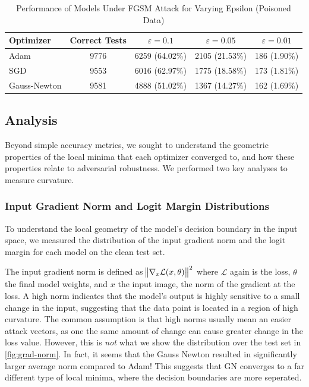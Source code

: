 \documentclass{article}
\begin{document}
    \begin{table}[ht!]
        \centering
        \caption{Performance of Models Under FGSM Attack for Varying Epsilon (Poisoned Data)}
        \label{tab:fgsm_results_poisoned}
        \begin{tabular}{|l|c|c|c|c|}
            \hline
            \textbf{Optimizer} & \textbf{Correct Tests} & $\varepsilon=0.1$ & $\varepsilon=0.05$ & $\varepsilon=0.01$ \\
            \hline
            Adam               & 9776                   & 6259 (64.02\%)    & 2105 (21.53\%)     & 186 (1.90\%)       \\
            \hline
            SGD                & 9553                   & 6016 (62.97\%)    & 1775 (18.58\%)     & 173 (1.81\%)       \\
            \hline
            Gauss-Newton       & 9581                   & 4888 (51.02\%)    & 1367 (14.27\%)     & 162 (1.69\%)       \\
            \hline
        \end{tabular}
    \end{table}

    \subsection{Analysis}
    Beyond simple accuracy metrics, we sought to understand the geometric properties of the local minima that each optimizer converged to, and how these properties relate to adversarial robustness.
    We performed two key analyses to measure curvature.

    \subsubsection{Input Gradient Norm and Logit Margin Distributions}
    To understand the local geometry of the model's decision boundary in the input space, we measured the distribution of the input gradient norm and the logit margin for each model on the clean test set.

    The input gradient norm is defined as $\norm{\nabla_x \mathcal L(x, \theta)}^2$ where $\mathcal L$ again is the loss, $\theta$ the final model weights, and $x$ the input image, the norm of the gradient at the loss.
    A high norm indicates that the model's output is highly sensitive to a small change in the input, suggesting that the data point is located in a region of high curvature.
    The common assumption is that high norms usually mean an easier attack vectors, as one the same amount of change can cause greater change in the loss value.
    However, this is \emph{not} what we show the distribution over the test set in \cref{fig:grad-norm}.
    In fact, it seems that the Gauss Newton resulted in significantly larger average norm compared to Adam!
    This suggests that GN converges to a far different type of local minima, where the decision boundaries are more seperated.
\end{document}
